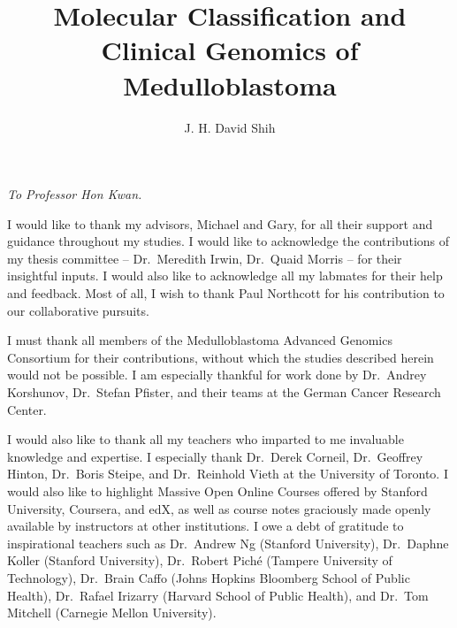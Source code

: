 \documentclass[12pt]{ut-thesis}
\author{J. H. David Shih}
\title{\textbf{Molecular Classification and Clinical Genomics of Medulloblastoma}}
\begin{document}

\begin{preliminary}

\maketitle

\cleardoublepage

\begin{abstract}
\setlength{\parindent}{0em}

\end{abstract}

\cleardoublepage

\begin{dedication}
\begin{center}
\vspace{1in}
\emph{To Professor Hon Kwan.}
\end{center}
\end{dedication}

\newpage

\begin{acknowledgements}
I would like to thank my advisors, Michael and Gary, for all their support and guidance throughout my studies. I would like to acknowledge the contributions of my thesis committee -- Dr.\ Meredith Irwin, Dr.\ Quaid Morris -- for their insightful inputs. I would also like to acknowledge all my labmates for their help and feedback. Most of all, I wish to thank Paul Northcott for his contribution to our collaborative pursuits.

I must thank all members of the Medulloblastoma Advanced Genomics Consortium for their contributions, without which the studies described herein would not be possible. I am especially thankful for work done by Dr.\ Andrey Korshunov, Dr.\ Stefan Pfister, and their teams at the German Cancer Research Center.

I would also like to thank all my teachers who imparted to me invaluable knowledge and expertise. I especially thank Dr.\ Derek Corneil, Dr.\ Geoffrey Hinton, Dr.\ Boris Steipe, and Dr.\ Reinhold Vieth at the University of Toronto. I would also like to highlight Massive Open Online Courses offered by Stanford University, Coursera, and edX, as well as course notes graciously made openly available by instructors at other institutions. I owe a debt of gratitude to inspirational teachers such as Dr.\ Andrew Ng (Stanford University), Dr.\ Daphne Koller (Stanford University), Dr.\ Robert Pich\'{e} (Tampere University of Technology), Dr.\ Brain Caffo (Johns Hopkins Bloomberg School of Public Health), Dr.\ Rafael Irizarry (Harvard School of Public Health), and Dr.\ Tom Mitchell (Carnegie Mellon University).


\end{acknowledgements}
\end{preliminary}
\end{document}
